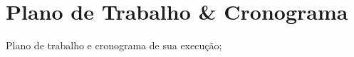 \chapter[Plano de Trabalho \& Cronograma]{Plano de Trabalho \& Cronograma}\label{PlanoTrabalhoCronograma}

Plano de trabalho e cronograma de sua execução;



  

  
